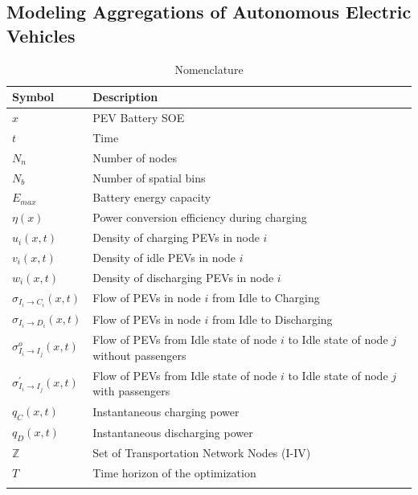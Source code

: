 \documentclass[journal]{IEEEtran}
\begin{document}
\subsection{Modeling Aggregations of Autonomous Electric Vehicles}
\begin{table}[!htbp]
\renewcommand{\arraystretch}{1.3}
\caption{Nomenclature}
\label{tab:symbols}
\centering
\def\colmargin{6.75cm}
\begin{tabular}{ll}
\hline
\textbf{Symbol} & \textbf{Description}\\
\hline
$x$ & PEV Battery SOE\\
$t$ & Time\\
$N_n$ & Number of nodes\\
$N_b$ & Number of spatial bins\\
$E_{max}$ & Battery energy capacity \\
$\eta(x)$ & Power conversion efficiency during charging \\
$u_i(x,t)$ & Density of charging PEVs in node $i$\\
$v_i(x,t)$ & Density of idle PEVs in node $i$\\
$w_i(x,t)$ & Density of discharging PEVs in node $i$\\
$\sigma_{I_i \rightarrow C_i}(x,t)$ & \parbox[t]{\colmargin}{ \raggedright Flow of PEVs in node $i$ from Idle to Charging} \\
$\sigma_{I_i \rightarrow D_i}(x,t)$ & \parbox[t]{\colmargin}{Flow of PEVs in node $i$ from Idle to Discharging} \\
$\sigma_{I_i \rightarrow I_j}^o(x,t)$ & \parbox[t]{\colmargin}{Flow of PEVs from Idle state of node $i$ to Idle state of node $j$ without passengers} \\
$\sigma_{I_i \rightarrow I_j}^\prime(x,t)$ & \parbox[t]{\colmargin}{ Flow of PEVs from Idle state of node $i$ to Idle state of node $j$ with passengers} \\
$q_C(x,t)$ & Instantaneous charging power \\
$q_D(x,t)$ & Instantaneous discharging power \\
$\mathbb{Z}$ & Set of Transportation Network Nodes (I-IV) \\
$T$ & Time horizon of the optimization \\
 & \\
\hline
\end{tabular}
\end{table}
\end{document}

